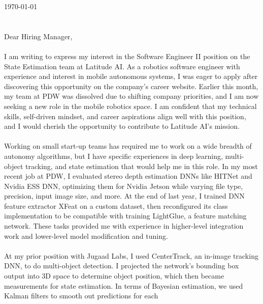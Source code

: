 \documentclass{coverletter}
\begin{document}
\hline{0.5pt}\vspace{10pt}

\today
\\~\\~\\
Dear Hiring Manager,
\\~\\
I am writing to express my interest in the Software Engineer II position on the State
Estimation team at Latitude AI. As a robotics software engineer with experience and
interest in mobile autonomous systems, I was eager to apply after discovering this
opportunity on the company's career website. Earlier this month, my team at PDW was
dissolved due to shifting company priorities, and I am now seeking a new role in the
mobile robotics space. I am confident that my technical skills, self-driven mindset, and
career aspirations align well with this position, and I would cherish the opportunity to
contribute to Latitude AI's mission.
\\~\\
Working on small start-up teams has required me to work on a wide breadth of autonomy
algorithms, but I have specific experiences in deep learning, multi-object tracking, and state estimation that would help me in this role. In my most recent job at PDW, I evaluated stereo depth estimation DNNs like HITNet and Nvidia ESS DNN, optimizing them for Nvidia Jetson while varying file type, precision, input image size, and more. At the end of last year, I trained DNN feature extractor XFeat on a custom dataset, then reconfigured its class implementation to be compatible with training LightGlue, a feature matching network. These tasks provided me with experience in higher-level integration work and lower-level model modification and tuning.
\\~\\
At my prior position with Jugaad Labs, I used CenterTrack, an in-image tracking DNN, to
do multi-object detection. I projected the network's bounding box output into 3D space to
determine object position, which then became measurements for state estimation. In terms
of Bayesian estimation, we used Kalman filters to smooth out predictions for each
\end{document}
